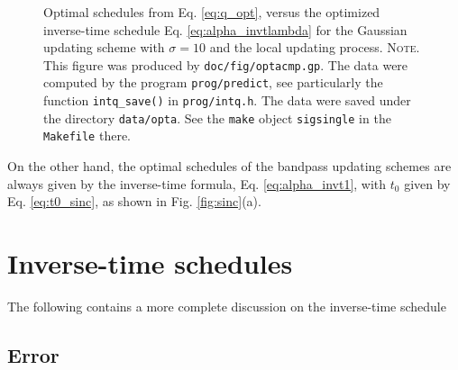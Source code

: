 \documentclass[preprint, floatfix]{revtex4-1}
\newcommand{\note}[1]{{\color{DarkGreen}\footnotesize \textsc{Note.} #1}}
\begin{document}
\begin{figure}[h]
\begin{center}
  \caption{
    \label{fig:optacmp}
    Optimal schedules from Eq. \eqref{eq:q_opt},
    versus the optimized inverse-time schedule
    Eq. \eqref{eq:alpha_invtlambda}
    for the Gaussian updating scheme
    with $\sigma = 10$
    and the local updating process.
    \note{This figure was produced by \texttt{doc/fig/optacmp.gp}.
      The data were computed by the program \texttt{prog/predict},
      see particularly the function \texttt{intq\_save()}
      in \texttt{prog/intq.h}.
      The data were saved under the directory \texttt{data/opta}.
      See the \texttt{make} object \texttt{sigsingle}
      in the \texttt{Makefile} there.
    }%
  }
\end{center}
\end{figure}




On the other hand,
the optimal schedules of the bandpass updating schemes
are always given by the inverse-time formula,
Eq. \eqref{eq:alpha_invt1},
with $t_0$ given by Eq. \eqref{eq:t0_sinc},
as shown in Fig. \ref{fig:sinc}(a).
%


\appendix


\section{\label{sec:invt_schedule}
Inverse-time schedules}



The following contains a more complete discussion
on the inverse-time schedule


\subsection{\label{sec:invt_error}
Error
}
\end{document}
